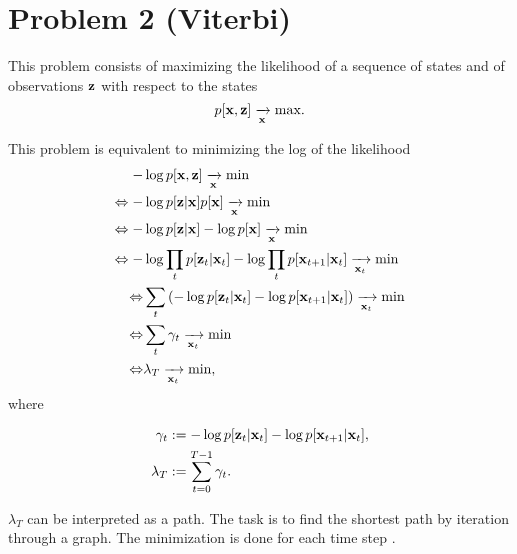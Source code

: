 \documentclass{article}
\begin{document}
\section{Problem 2 (Viterbi)}

This problem consists of maximizing the likelihood of a sequence of states and of observations ${\bf{z}}$ with respect to the states
\begin{equation}
p[{\bf{x}},{\bf{z}}]  \xrightarrow[{\bf{x}}]{}  \text{max}.
\end{equation} 

This problem is equivalent to minimizing the log of the likelihood
\begin{align}
- &\log p[{\bf{x}},{\bf{z}}]  \xrightarrow[{\bf{x}}]{}  \text{min} \\
\Leftrightarrow
- &\log p[{\bf{z}}|{\bf{x}}]p[{\bf{x}}]  \xrightarrow[{\bf{x}}]{}  \text{min} \\
\Leftrightarrow
- &\log p[{\bf{z}}|{\bf{x}}]- \log p[{\bf{x}}]  \xrightarrow[{\bf{x}}]{} \text{min} \\
\Leftrightarrow
- &\log \prod_t p[{\bf{z}}_t|{\bf{x}}_t]- \log \prod_t p[{\bf{x}}_{t+1}|{\bf{x}}_{t}]  \xrightarrow[{\bf{x}}_t]{} \text{min} \\
\Leftrightarrow
 &  \sum_t \left(-\log p[{\bf{z}}_t|{\bf{x}}_t]- \log  p[{\bf{x}}_{t+1}|{\bf{x}}_{t}] \right) \xrightarrow[{\bf{x}}_t]{} \text{min} \\
 \Leftrightarrow
 &  \sum_t \gamma_t \xrightarrow[{\bf{x}}_t]{} \text{min} \\
  \Leftrightarrow
 &  \lambda_T \xrightarrow[{\bf{x}}_t]{} \text{min},
\end{align} where

\begin{align}
\gamma_t &:= -\log p[{\bf{z}}_t|{\bf{x}}_t]- \log  p[{\bf{x}}_{t+1}|{\bf{x}}_{t}],\\
\lambda_T &:=\sum_{t=0}^{T-1} \gamma_t.  
\end{align}

$\lambda_T$ can be interpreted as a path. The task is to find the shortest path by iteration through a graph. The minimization is done for each time step \cite{forn73}. \newline 
\end{document}
